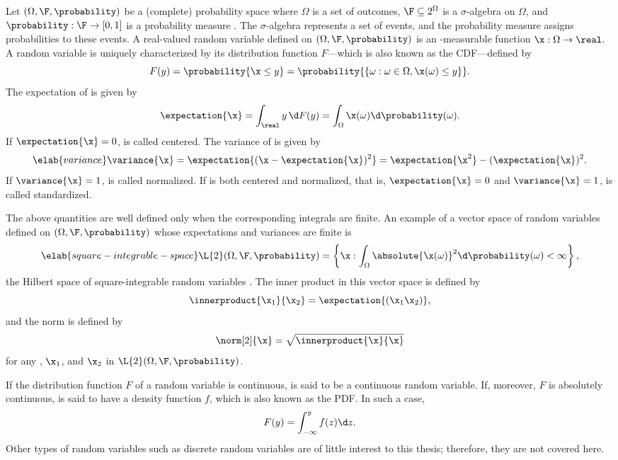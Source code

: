 Let $(\Omega, \F, \probability)$ be a (complete) probability space where
$\Omega$ is a set of outcomes, $\F \subseteq 2^\Omega$ is a $\sigma$-algebra on
$\Omega$, and $\probability: \F \to [0, 1]$ is a probability measure
\cite{durrett2010}. The $\sigma$-algebra represents a set of events, and the
probability measure assigns probabilities to these events. A real-valued random
variable defined on $(\Omega, \F, \probability)$ is an \F-measurable function
$\x: \Omega \to \real$. A random variable \x is uniquely characterized by its
distribution function $F$---which is also known as the \ac{CDF}---defined by
\begin{equation*}
  F(y) = \probability{\x \leq y} = \probability{\{ \omega: \omega \in \Omega, \x(\omega) \leq y \}}.
\end{equation*}
The expectation of \x is given by
\[
  \expectation{\x} = \int_\real y \, \d F(y) = \int_\Omega \x(\omega) \d \probability(\omega).
\]
If $\expectation{\x} = 0$, \x is called centered. The variance of \x is given
by
\begin{equation} \elab{variance}
  \variance{\x}
  = \expectation{(\x - \expectation{\x})^2}
  = \expectation{\x^2} - (\expectation{\x})^2.
\end{equation}
If $\variance{\x} = 1$, \x is called normalized. If \x is both centered and
normalized, that is, $\expectation{\x} = 0$ and $\variance{\x} = 1$, \x is
called standardized.

The above quantities are well defined only when the corresponding integrals are
finite. An example of a vector space of random variables defined on $(\Omega,
\F, \probability)$ whose expectations and variances are finite is
\begin{equation} \elab{square-integrable-space}
  \L{2}(\Omega, \F, \probability) = \left\{ \x: \int_\Omega \absolute{\x(\omega)}^2 \d \probability(\omega) < \infty \right\},
\end{equation}
the Hilbert space of square-integrable random variables \cite{janson1997}. The
inner product in this vector space is defined by
\[
  \innerproduct{\x_1}{\x_2} = \expectation{(\x_1 \x_2)},
\]
and the norm is defined by
\[
  \norm[2]{\x} = \sqrt{\innerproduct{\x}{\x}}
\]
for any \x, $\x_1$, and $\x_2$ in $\L{2}(\Omega, \F, \probability)$.

If the distribution function $F$ of a random variable \x is continuous, \x is
said to be a continuous random variable. If, moreover, $F$ is absolutely
continuous, \x is said to have a density function $f$, which is also known as
the \ac{PDF}. In such a case,
\[
  F(y) = \int_{-\infty}^y f(z) \d z.
\]
Other types of random variables such as discrete random variables are of little
interest to this thesis; therefore, they are not covered here.

